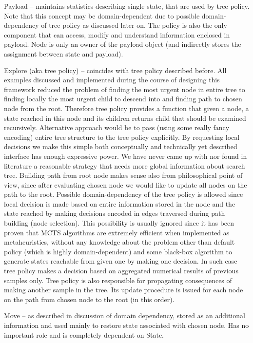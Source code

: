 Payload -- maintains statistics describing single state, that are used by tree
policy. Note that this concept may be domain-dependent due to possible
domain-dependency of tree policy as discussed later on. The policy is also the
only component that can access, modify and understand information enclosed in
payload. Node is only an owner of the payload object (and indirectly stores the
assignment between state and payload).

Explore (aka tree policy) -- coincides with tree policy described before.
All examples discussed and implemented during the course of designing this
framework reduced the problem of finding the most urgent node in entire tree to
finding locally the most urgent child to descend into and finding path to
chosen node from the root. Therefore tree policy provides a function that
given a node, a state reached in this node and its children returns child that
should be examined recursively. Alternative approach would be to pass (using
some really fancy encoding) entire tree structure to the tree policy
explicitly. By requesting local decisions we make this simple both conceptually
and technically yet described interface has enough expressive power. We have
never came up with nor found in literature a reasonable strategy that needs
more global information about search tree.
Building path from root node makes sense also from philosophical point of view,
since after evaluating chosen node we would like to update all nodes on the
path to the root.
Possible domain-dependency of the tree policy is allowed since local decision
is made based on entire information stored in the node and the state reached by
making decisions encoded in edges traversed during path building (node
selection).
This possibility is usually ignored since it has been proven that MCTS
algorithms are extremely efficient when implemented as metaheuristics, without
any knowledge about the problem other than default policy (which is highly
domain-dependent) and some black-box algorithm to generate states reachable
from given one by making one decision. In such case tree policy makes a
decision based on aggregated numerical results of previous samples only.
Tree policy is also responsible for propagating consequences of making another
sample in the tree. Its update procedure is issued for each node on the path
from chosen node to the root (in this order).

Move -- as described in discussion of domain dependency, stored as an
additional information and used mainly to restore state associated with chosen
node. Has no important role and is completely dependent on State.

